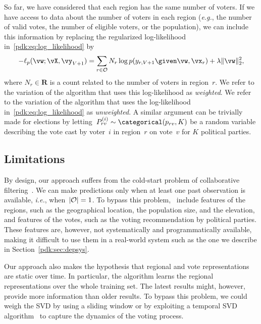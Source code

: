 So far, we have considered that each region has the same number of voters.
If we have access to data about the number of voters in each region (\textit{e.g.}, the number of valid votes, the number of eligible voters, or the population), we can include this information by replacing the regularized log-likelihood in~\eqref{pdk:eq:log_likelihood} by
\begin{equation}
	\label{pdk:eq:weighted}
	-\ell_p(\vw ; \vX, \vy_{V+1}) = \sum_{r \in \Obs} N_r \log p(y_{r,V+1} \given \vw, \vx_r) + \lambda \Vert \vw \Vert_2^2,
\end{equation}
where $N_r \in \mathbf{R}$ is a count related to the number of voters in region~$r$.
We refer to the variation of the algorithm that uses this log-likelihood as \textit{weighted}.
We refer to the variation of the algorithm that uses the log-likelihood in~\eqref{pdk:eq:log_likelihood} as \textit{unweighted}.
A similar argument can be trivially made for elections by letting~$P_{rv}^{(i)} \sim \categorical(p_{rv}, K)$ be a random variable describing the vote cast by voter~$i$ in region~$r$ on vote~$v$ for $K$ political parties.

\subsection{Limitations}

By design, our approach suffers from the cold-start problem of collaborative filtering~\cite{koren2009matrix}.
We can make predictions only when at least one past observation is available, \textit{i.e.}, when~$\vert \mathcal{O} \vert = 1$.
To bypass this problem,~\citet{etter2016online} include features of the regions, such as the geographical location, the population size, and the elevation, and features of the votes, such as the voting recommendation by political parties.
These features are, however, not systematically and programmatically available, making it difficult to use them in a real-world system such as the one we describe in Section~\ref{pdk:sec:depsys}.

Our approach also makes the hypothesis that regional and vote representations are static over time.
In particular, the algorithm learns the regional representations over the whole training set.
The latest results might, however, provide more information than older results.
To bypass this problem, we could weigh the SVD by using a sliding window or by exploiting a temporal SVD algorithm~\cite{bamler2017dynamic} to capture the dynamics of the voting process.

